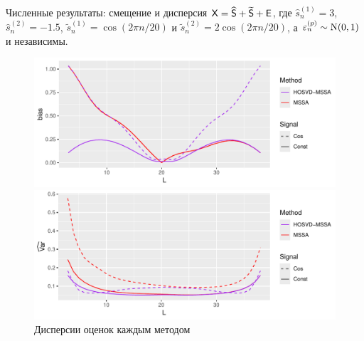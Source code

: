 \documentclass[pdf, unicode, 9pt, notheorems, handout]{beamer}
\begin{document}
    \begin{frame}{Численные результаты: смещение и дисперсия}
        $\mathsf{X} = \widehat{\mathsf{S}} + \widetilde{\mathsf{S}} + \mathsf{E}$,
        где $\hat{s}_n^{(1)} = 3$, $\hat{s}_n^{(2)} = -1.5$,
        $\tilde{s}_n^{(1)} = \cos(2\pi n / 20)$ и $\tilde{s}_n^{(2)} = 2\cos(2\pi n / 20)$, 
        а $\varepsilon_n^{(p)}\sim \mathrm{N}(0, 1)$ и независимы. 
        \begin{figure}
            \begin{minipage}[c]{0.8\textwidth}
                \hspace{-0.4cm}
                \includegraphics[width=\linewidth]{./img/approx_sep_no_noise_slides}
            \end{minipage}\hfill
            \begin{minipage}[c]{0.2\textwidth}
                \caption{Смещение оценок каждым методом (RMSE без шума)}
            \end{minipage}
            \begin{minipage}[c]{0.8\textwidth}
                \vspace{-0.1cm}
                \hspace{-0.4cm}
                \includegraphics[width=\linewidth]{./img/approx_sep_large_noise_var}
            \end{minipage}\hfill
            \begin{minipage}[c]{0.2\textwidth}
                \caption{Дисперсии оценок каждым методом}
            \end{minipage}
        \end{figure}
    \end{frame}
\end{document}
